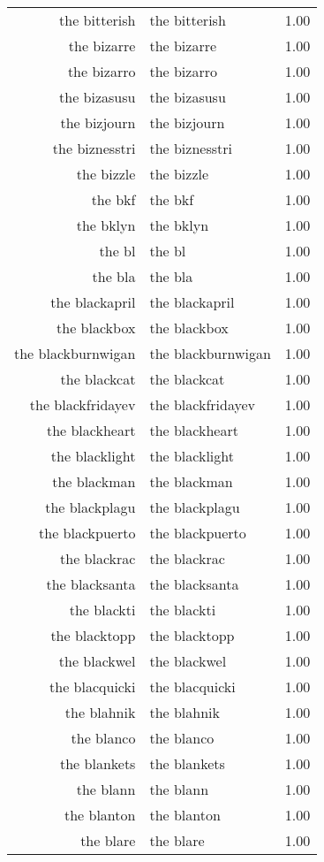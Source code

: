 \begin{table}[ht]
\begin{tabular}{rlr}
  the bitterish & the bitterish & 1.00 \\ 
  the bizarre & the bizarre & 1.00 \\ 
  the bizarro & the bizarro & 1.00 \\ 
  the bizasusu & the bizasusu & 1.00 \\ 
  the bizjourn & the bizjourn & 1.00 \\ 
  the biznesstri & the biznesstri & 1.00 \\ 
  the bizzle & the bizzle & 1.00 \\ 
  the bkf & the bkf & 1.00 \\ 
  the bklyn & the bklyn & 1.00 \\ 
  the bl & the bl & 1.00 \\ 
  the bla & the bla & 1.00 \\ 
  the blackapril & the blackapril & 1.00 \\ 
  the blackbox & the blackbox & 1.00 \\ 
  the blackburnwigan & the blackburnwigan & 1.00 \\ 
  the blackcat & the blackcat & 1.00 \\ 
  the blackfridayev & the blackfridayev & 1.00 \\ 
  the blackheart & the blackheart & 1.00 \\ 
  the blacklight & the blacklight & 1.00 \\ 
  the blackman & the blackman & 1.00 \\ 
  the blackplagu & the blackplagu & 1.00 \\ 
  the blackpuerto & the blackpuerto & 1.00 \\ 
  the blackrac & the blackrac & 1.00 \\ 
  the blacksanta & the blacksanta & 1.00 \\ 
  the blackti & the blackti & 1.00 \\ 
  the blacktopp & the blacktopp & 1.00 \\ 
  the blackwel & the blackwel & 1.00 \\ 
  the blacquicki & the blacquicki & 1.00 \\ 
  the blahnik & the blahnik & 1.00 \\ 
  the blanco & the blanco & 1.00 \\ 
  the blankets & the blankets & 1.00 \\ 
  the blann & the blann & 1.00 \\ 
  the blanton & the blanton & 1.00 \\ 
  the blare & the blare & 1.00 \\ 

\end{tabular}
\end{table}
